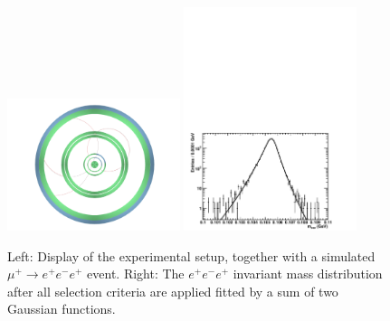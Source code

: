 \begin{figure}[htb]
\begin{center}
\includegraphics[width=0.45\textwidth]{Figures/mu3e-event.pdf}
\includegraphics[width=0.45\textwidth]{Figures/mu3e-resoFit.pdf}
\end{center}
\caption{Left: Display of the experimental setup, together with a simulated $\mu^+ \rightarrow e^+e^-e^+$ event. 
Right:  The $e^+e^-e^+$ invariant mass distribution after all selection criteria are applied fitted by a 
sum of two Gaussian functions.}
\label{Fig::mu3e}
\end{figure}

